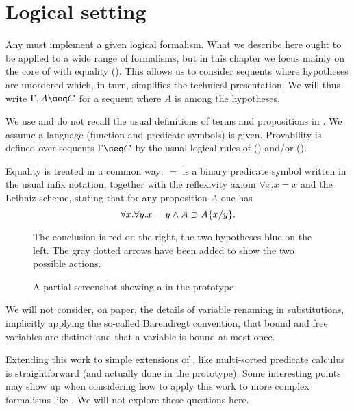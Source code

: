 
\section{Logical setting}

Any  must implement a given logical formalism. What we describe here
ought to be applied to a wide range of formalisms, but in this chapter we focus
mainly on the core of   with equality
(). This allows us to consider sequents where hypotheses are
unordered which, in turn, simplifies the technical presentation. We will thus
write $\Gamma,A \seq C$ for a sequent where $A$ is among the hypotheses.

We use and do not recall the usual definitions of terms and propositions in
. We assume a  language (function and predicate
symbols) is given. Provability is defined over sequents $\Gamma\seq C$ by the
usual logical rules of  () and/or
 ().

Equality is treated in a common way: $=$ is a binary
predicate symbol written in the usual infix notation, together with the
reflexivity axiom $\forall x.x=x$ and the Leibniz scheme, stating that for any
proposition $A$ one has
$$\forall x.\forall y. x=y\land A \supset A \{ x / y \}.$$

\begin{figure*}
 \begin{center}
 \end{center}
 The conclusion is red on the right, the two hypotheses blue on the left. The
 gray dotted arrows have been added to show the two possible actions.
 \caption{A partial screenshot showing a  in the  prototype}
 \end{figure*}

We will not consider, on paper, the details of variable renaming in
substitutions, implicitly applying the so-called Barendregt
convention, that bound and free variables are distinct and that a
variable is bound at most once.

Extending this work to simple extensions of , like multi-sorted predicate
calculus is straightforward (and actually done in the  prototype). Some
interesting points may show up when considering how to apply this work to more
complex formalisms like . We will not explore these questions here.

